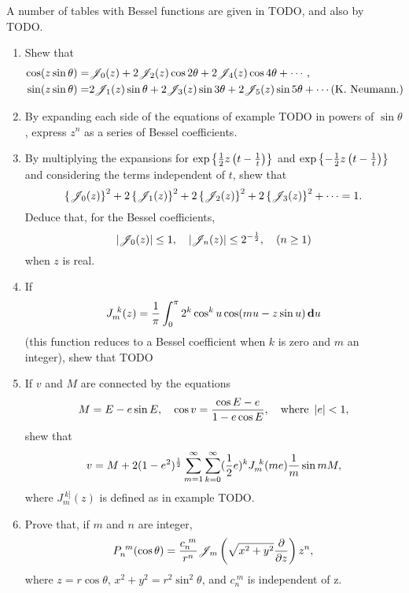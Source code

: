 A number of tables with Bessel functions are given in TODO, and also
by TODO.

%
%
\miscexamples
\begin{enumerate}
\item Shew that
  \begin{align*}
    \cos(z \sin\theta)
    =& \besJ_{0}(z) + 2 \besJ_{2}(z) \cos 2\theta + 2 \besJ_{4}(z)
    \cos 4\theta + \cdots,
    \\
    \sin(z\sin\theta)
    =& 2\besJ_{1}(z) \sin\theta + 2 \besJ_{3}(z)\sin 3\theta + 2
    \besJ_{5}(z) \sin 5\theta + \cdots
    \addexamplecitation{K. Neumann.}
  \end{align*}
\item
  By expanding each side of the equations of example TODO in powers of
  $\sin\theta$, express $z^{n}$ as a series of Bessel coefficients.
\item
  By multiplying the expansions for
  $\exp{ \left\{  \frac{1}{2} z\left( t - \frac{1}{t} \right)  \right\}  }$
  and
  $\exp{ \left\{ - \frac{1}{2} z\left( t - \frac{1}{t} \right)  \right\}  }$
  and considering the terms independent of $t$, shew that
  $$
  \left\{  \mathscr{J}_{0}(z)  \right\}^{2}
  + 2 \left\{  \mathscr{J}_{1}(z)  \right\}^{2}
  + 2 \left\{  \mathscr{J}_{2}(z)  \right\}^{2}
  + 2 \left\{  \mathscr{J}_{3}(z)  \right\}^{2}
  +
  \cdots
  =
  1.
  $$
  Deduce that, for the Bessel coefficients,
  $$
  \left| \mathscr{J}_{0}(z) \right| \leq 1,
  \quad
  \left| \mathscr{J}_{n}(z) \right| \leq 2^{-\frac{1}{2}},
  \quad
  (n \geq 1)
  $$
  when $z$ is real.
\item
  If
  $$
  J_{m}^{\ k}(z)
  =
  \frac{1}{\pi}
  \int_{0}^{\pi}
  2^{k}
  \cos^{k} u
  \cos (m u - z\sin u)
  \, \mathbf{d} u
  $$
  (this function reduces to a Bessel coefficient when $k$ is zero and
  $m$ an integer), shew that
  TODO
\item
  If $v$ and $M$ are connected by the equations
  $$
  M = E - e \sin E,
  \quad
  \cos v = \frac{\cos E - e}{1 - e\cos E},
  \quad
  \text{where } \left| e \right| < 1,
  $$
  shew that
  $$
  v
  =
  M
  +
  2 (1-e^{2})^{\frac{1}{2}}
  \sum_{m=1}^{\infty}
  \sum_{k=0}^{\infty}
  (\frac{1}{2} e)^{k}
  J_{m}^{\ k}(me)
  \frac{1}{m}
  \sin mM,
  $$
  where $J_{m}^{\ k]}(z)$ is defined as in example TODO.
%
%
\item
  Prove that, if $m$ and $n$ are integer,
  $$
  P_{n}^{\ m}(\cos\theta)
  =
  \frac{c_{n}^{\ m}}{r^{n}}
  \mathscr{J}_{m}
  \left(  \sqrt{x^{2}+y^{2}} \frac{\partial}{\partial z} \right)
  z^{n},
  $$
  where $z = r\cos\theta$, $x^{2} + y^{2} = r^{2} \sin^{2}\theta$, and
  $c_{n}^{\ m}$ is independent of z.

\end{enumerate}
